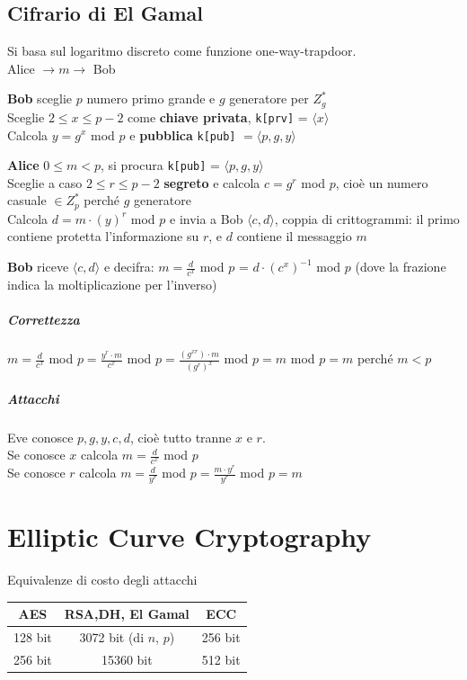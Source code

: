 \documentclass[10pt]{book}
\begin{document}
\section{Cifrario di El Gamal}
Si basa sul logaritmo discreto come funzione one-way-trapdoor.\\
Alice $\rightarrow m\rightarrow$ Bob
\begin{list}{}{}
	\item \textbf{Bob} sceglie $p$ numero primo grande e $g$ generatore per $Z_g^*$\\
	Sceglie $2\leq x \leq p-2$ come \textbf{chiave privata}, \texttt{k[prv]} = $\langle x\rangle$\\
	Calcola $y = g^x$ mod $p$ e \textbf{pubblica} \texttt{k[pub]} $=\langle p,g,y\rangle$
	\item \textbf{Alice} $0\leq m < p$, si procura \texttt{k[pub]} = $\langle p,g,y\rangle$\\
	Sceglie a caso $2 \leq r \leq p-2$ \textbf{segreto} e calcola $c = g^r$ mod $p$, cioè un numero casuale $\in Z_p^*$ perché $g$ generatore\\
	Calcola $d = m\cdot \left(y\right)^r$ mod $p$ e invia a Bob $\langle c,d\rangle$, coppia di crittogrammi: il primo contiene protetta l'informazione su $r$, e $d$ contiene il messaggio $m$
	\item \textbf{Bob} riceve $\langle c,d\rangle$ e decifra: $m = \frac{d}{c^x}$ mod $p$ = $d\cdot\left(c^x\right)^{-1}$ mod $p$ (dove la frazione indica la moltiplicazione per l'inverso)
\end{list}
\pagebreak
\paragraph{Correttezza} $m = \frac{d}{c^x}$ mod $p = \frac{y^r\cdot m}{c^x}$ mod $p = \frac{(g^{xr})\cdot m}{(g^r)^x}$ mod $p = m$ mod $p = m$ perché $m < p$
\paragraph{Attacchi} Eve conosce $p,g,y,c,d$, cioè tutto tranne $x$ e $r$.\\
Se conosce $x$ calcola $m = \frac{d}{c^x}$ mod $p$\\
Se conosce $r$ calcola $m = \frac{d}{y^r}$ mod $p = \frac{m\cdot y^r}{y^r}$ mod $p = m$
\chapter{Elliptic Curve Cryptography}
\begin{center}
Equivalenze di costo degli attacchi\\
\begin{tabular}{c | c | c}
AES & RSA,DH, El Gamal & ECC\\
\hline
128 bit & 3072 bit (di $n$, $p$) & 256 bit\\
256 bit & 15360 bit & 512 bit
\end{tabular}
\end{center}
\end{document}
